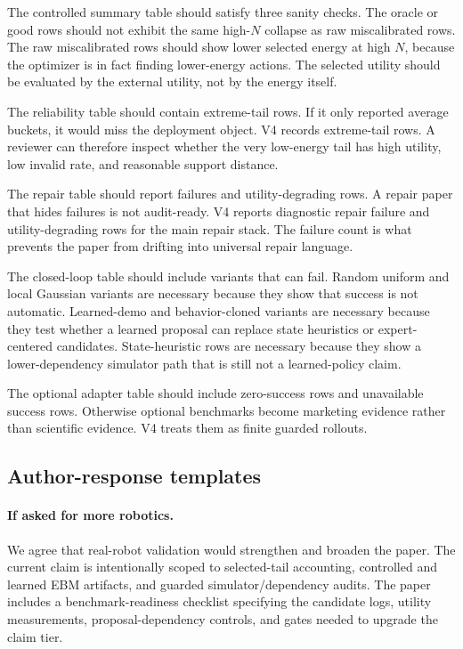 The controlled summary table should satisfy three sanity checks. The oracle or
good rows should not exhibit the same high-\(N\) collapse as raw
miscalibrated rows. The raw miscalibrated rows should show lower selected
energy at high \(N\), because the optimizer is in fact finding lower-energy
actions. The selected utility should be evaluated by the external utility, not
by the energy itself.

The reliability table should contain extreme-tail rows. If it only reported
average buckets, it would miss the deployment object. V4 records
\VFourEBMReliabilityExtremeRows{} extreme-tail rows. A reviewer can therefore
inspect whether the very low-energy tail has high utility, low invalid rate,
and reasonable support distance.

The repair table should report failures and utility-degrading rows. A repair
paper that hides failures is not audit-ready. V4 reports
\VFourEBMRepairFailures{} diagnostic repair failure and
\VFourEBMRepairDegrades{} utility-degrading rows for the main repair stack.
The failure count is what prevents the paper from drifting into universal
repair language.

The closed-loop table should include variants that can fail. Random uniform
and local Gaussian variants are necessary because they show that success is
not automatic. Learned-demo and behavior-cloned variants are necessary because
they test whether a learned proposal can replace state heuristics or
expert-centered candidates. State-heuristic rows are necessary because they
show a lower-dependency simulator path that is still not a learned-policy
claim.

The optional adapter table should include zero-success rows and unavailable
success rows. Otherwise optional benchmarks become marketing evidence rather
than scientific evidence. V4 treats them as finite guarded rollouts.

\subsection{Author-response templates}
\label{app:V4-author-response}

\paragraph{If asked for more robotics.}
We agree that real-robot validation would strengthen and broaden the paper.
The current claim is intentionally scoped to selected-tail accounting,
controlled and learned EBM artifacts, and guarded simulator/dependency audits.
The paper includes a benchmark-readiness checklist specifying the candidate
logs, utility measurements, proposal-dependency controls, and gates needed to
upgrade the claim tier.

